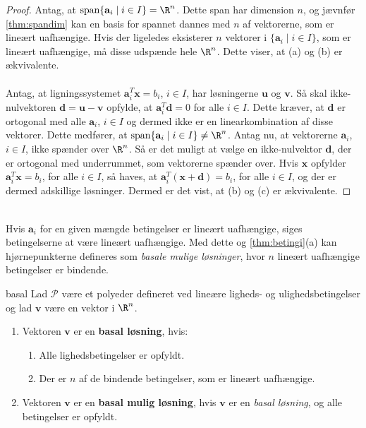 \begin{proof}
Antag, at $\text{span}\{\textbf{a}_i \mid i \in I\}= \R^n$.
Dette span har dimension $n$, og jævnfør \ref{thm:spandim} %
kan en basis for spannet dannes med $n$ af vektorerne, som er lineært uafhængige.
%
Hvis der ligeledes eksisterer $n$ vektorer i $\{\textbf{a}_i \mid i \in I\}$, som er lineært uafhængige, må disse udspænde hele $\R^n$.
Dette viser, at (a) og (b) er ækvivalente.\\\\
%
Antag, at ligningssystemet $\textbf{a}^T_i\textbf{x}=b_i$, $i \in I$, har løsningerne $\textbf{u}$ og $\textbf{v}$.
Så skal ikke-nulvektoren $\textbf{d} = \textbf{u} - \textbf{v}$ opfylde, at $\textbf{a}^T_i\textbf{d}=0$ for alle $i \in I$.
Dette kræver, at $\textbf{d}$ er ortogonal med alle $\textbf{a}_i$, $i \in I$ og dermed ikke er en linearkombination af disse vektorer.
Dette medfører, at $\text{span}\{\textbf{a}_i \mid i \in I\} \neq \R^n$.
%
Antag nu, at vektorerne $\textbf{a}_i$, $i \in I$, ikke spænder over $\R^n$.
Så er det muligt at vælge en ikke-nulvektor $\textbf{d}$, der er ortogonal med underrummet, som vektorerne spænder over.
Hvis $\textbf{x}$ opfylder  $\textbf{a}^T_i\textbf{x}= b_i$, for alle $i \in I$, så haves, at $\textbf{a}^T_i(\textbf{x}+\textbf{d})= b_i$, for alle $i \in I$, og der er dermed adskillige løsninger.
Dermed er det vist, at (b) og (c) er ækvivalente.
\end{proof}\\
%
Hvis $\textbf{a}_i$ for en given mængde betingelser er lineært uafhængige, siges betingelserne at være lineært uafhængige.
Med dette og \ref{thm:betingi}(a) kan hjørnepunkterne defineres som \textit{basale mulige løsninger}, hvor $n$ lineært uafhængige betingelser er bindende.
%
\begin{defn}{}{basal}
Lad $\mathcal{P}$ være et polyeder defineret ved lineære ligheds- og ulighedsbetingelser og lad $\textbf{v}$ være en vektor i $\R^n$.
%
\begin{enumerate}[label=(\alph*)]
\item Vektoren $\textbf{v}$ er en \textbf{basal løsning}, hvis:
%
\begin{enumerate}[label=(\roman*)]
\item Alle lighedsbetingelser er opfyldt.
\item Der er $n$ af de bindende betingelser, som er lineært uafhængige.
\end{enumerate}
%
\item Vektoren $\textbf{v}$ er en \textbf{basal mulig løsning}, hvis $\textbf{v}$ er en \textit{basal løsning}, og alle betingelser er opfyldt.
\end{enumerate}
\end{defn}\noindent

